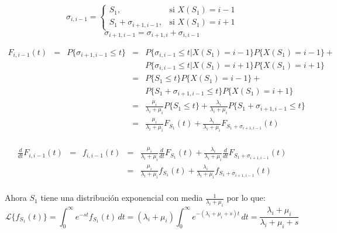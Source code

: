 \documentclass[11pt]{article}
\numberwithin{equation}{section} %
\begin{document}
\begin{equation}
\sigma_{i,i-1} =
\begin{cases}
S_{1}, & \mbox{si } X(S_{1})=i-1 \\
S_{1}+\sigma_{i+1,i-1}, & \mbox{si } X(S_{1})=i+1
\end{cases}
\end{equation}
\begin{equation}
\sigma_{i+1,i-1}=\sigma_{i+1,i}+\sigma_{i,i-1}
\end{equation}
 
\[
\begin{array}{rcrcl}
F_{i,i-1}(t) & = & P\{ \sigma_{i+1,i-1}\leq t \} & = & P\{ \sigma_{i,i-1}\leq t | X(S_{1})=i-1 \}P\{ X(S_{1})=i-1 \} +\\
 & & & & P\{ \sigma_{i,i-1}\leq t | X(S_{1})=i+1 \}P\{ X(S_{1})=i+1 \} \\
 & & & = & P\{ S_{1}\leq t\}P\{ X(S_{1})=i-1 \} +\\
 & & & & P\{ S_{1} + \sigma_{i+1,i-1}\leq t\}P\{ X(S_{1})=i+1 \} \\
 & & & = & \frac{\mu_{i}}{\lambda_{i}+\mu_{i}} P\{ S_{1}\leq t\} + \frac{\lambda_{i}}{\lambda_{i}+\mu_{i}} P\{ S_{1} + \sigma_{i+1,i-1}\leq t\}\\
 & & & = & \frac{\mu_{i}}{\lambda_{i}+\mu_{i}} F_{S_{1}}(t) + \frac{\lambda_{i}}{\lambda_{i}+\mu_{i}} F_{ S_{1} + \sigma_{i+1,i-1}}(t)\\
\end{array}
\]
 
\[
\begin{array}{rcrcl}
\frac{d}{dt} F_{i,i-1}(t) & = & f_{i,i-1}(t) & = & \frac{\mu_{i}}{\lambda_{i}+\mu_{i}} \frac{d}{dt} F_{S_{1}}(t) + \frac{\lambda_{i}}{\lambda_{i}+\mu_{i}} \frac{d}{dt} F_{ S_{1} + \sigma_{i+1,i-1}}(t)\\
 & & & = & \frac{\mu_{i}}{\lambda_{i}+\mu_{i}} f_{S_{1}}(t) + \frac{\lambda_{i}}{\lambda_{i}+\mu_{i}} f_{ S_{1} + \sigma_{i+1,i-1}}(t)\\
\end{array}
\]

Ahora $S_1$ tiene una distribución exponencial con media $\frac{1}{\lambda_i+\mu_i}$ por lo que:
\[
\mathcal{L}\{f_{S_1}(t)\}=\int_{0}^{\infty} e^{-st} f_{S_1}(t)\,dt=(\lambda_i+\mu_i)\int_{0}^{\infty} e^{-(\lambda_i+\mu_i+s)t}\,dt=\frac{\lambda_i+\mu_i}{\lambda_i+\mu_i+s}
\]
\end{document}
